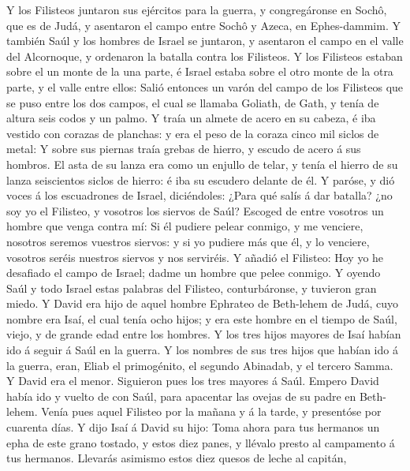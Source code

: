  Y los Filisteos juntaron sus ejércitos para la guerra, y
congregáronse en Sochô, que es de Judá, y asentaron el campo entre Sochô
y Azeca, en Ephes-dammim.  Y también Saúl y los hombres de
Israel se juntaron, y asentaron el campo en el valle del Alcornoque, y
ordenaron la batalla contra los Filisteos.  Y los
Filisteos estaban sobre el un monte de la una parte, é Israel estaba
sobre el otro monte de la otra parte, y el valle entre ellos:
 Salió entonces un varón del campo de los Filisteos que se
puso entre los dos campos, el cual se llamaba Goliath, de Gath, y tenía
de altura seis codos y un palmo.  Y traía un almete de
acero en su cabeza, é iba vestido con corazas de planchas: y era el peso
de la coraza cinco mil siclos de metal:  Y sobre sus
piernas traía grebas de hierro, y escudo de acero á sus hombros.
 El asta de su lanza era como un enjullo de telar, y tenía
el hierro de su lanza seiscientos siclos de hierro: é iba su escudero
delante de él.  Y paróse, y dió voces á los escuadrones de
Israel, diciéndoles: ¿Para qué salís á dar batalla? ¿no soy yo el
Filisteo, y vosotros los siervos de Saúl? Escoged de entre vosotros un
hombre que venga contra mí:  Si él pudiere pelear conmigo,
y me venciere, nosotros seremos vuestros siervos: y si yo pudiere más
que él, y lo venciere, vosotros seréis nuestros siervos y nos serviréis.
 Y añadió el Filisteo: Hoy yo he desafiado el campo de
Israel; dadme un hombre que pelee conmigo.  Y oyendo Saúl
y todo Israel estas palabras del Filisteo, conturbáronse, y tuvieron
gran miedo.  Y David era hijo de aquel hombre Ephrateo de
Beth-lehem de Judá, cuyo nombre era Isaí, el cual tenía ocho hijos; y
era este hombre en el tiempo de Saúl, viejo, y de grande edad entre los
hombres.  Y los tres hijos mayores de Isaí habían ido á
seguir á Saúl en la guerra. Y los nombres de sus tres hijos que habían
ido á la guerra, eran, Eliab el primogénito, el segundo Abinadab, y el
tercero Samma.  Y David era el menor. Siguieron pues los
tres mayores á Saúl.  Empero David había ido y vuelto de
con Saúl, para apacentar las ovejas de su padre en Beth-lehem.
 Venía pues aquel Filisteo por la mañana y á la tarde, y
presentóse por cuarenta días.  Y dijo Isaí á David su
hijo: Toma ahora para tus hermanos un epha de este grano tostado, y
estos diez panes, y llévalo presto al campamento á tus hermanos.
 Llevarás asimismo estos diez quesos de leche al capitán,
